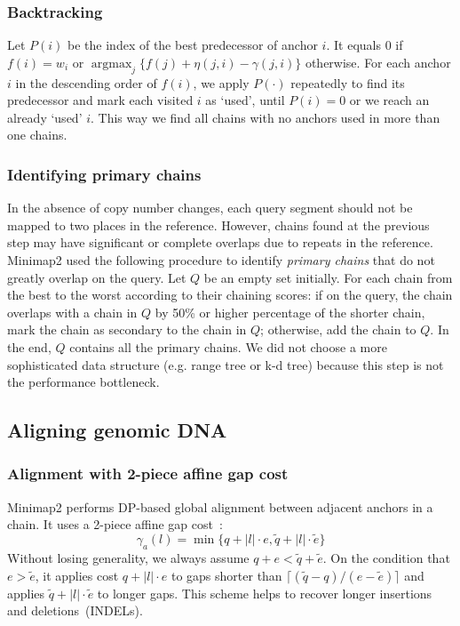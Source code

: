 \documentclass{bioinfo}
\DeclareMathOperator*{\argmax}{argmax}
\begin{document}
\begin{methods}
\subsubsection{Backtracking}
Let $P(i)$ be the index of the best predecessor of anchor $i$. It equals 0 if
$f(i)=w_i$ or $\argmax_j\{f(j)+\eta(j,i)-\gamma(j,i)\}$ otherwise. For each
anchor $i$ in the descending order of $f(i)$, we apply $P(\cdot)$ repeatedly to
find its predecessor and mark each visited $i$ as `used', until $P(i)=0$ or we
reach an already `used' $i$. This way we find all chains with no anchors used
in more than one chains.

\subsubsection{Identifying primary chains}
In the absence of copy number changes, each query segment should not be mapped
to two places in the reference. However, chains found at the previous step may
have significant or complete overlaps due to repeats in the reference.
Minimap2 used the following procedure to identify \emph{primary chains} that do
not greatly overlap on the query. Let $Q$ be an empty set initially. For each
chain from the best to the worst according to their chaining scores: if on the
query, the chain overlaps with a chain in $Q$ by 50\% or higher percentage of
the shorter chain, mark the chain as secondary to the chain in $Q$; otherwise,
add the chain to $Q$. In the end, $Q$ contains all the primary chains. We did
not choose a more sophisticated data structure (e.g. range tree or k-d tree)
because this step is not the performance bottleneck.

\subsection{Aligning genomic DNA}

\subsubsection{Alignment with 2-piece affine gap cost}

Minimap2 performs DP-based global alignment between adjacent anchors in a
chain. It uses a 2-piece affine gap cost~\citep{Gotoh:1990aa}:
\begin{equation}\label{eq:2-piece}
\gamma_a(l)=\min\{q+|l|\cdot e,\tilde{q}+|l|\cdot\tilde{e}\}
\end{equation}
Without losing generality, we always assume $q+e<\tilde{q}+\tilde{e}$.
On the condition that $e>\tilde{e}$, it applies cost $q+|l|\cdot e$ to gaps
shorter than $\lceil(\tilde{q}-q)/(e-\tilde{e})\rceil$ and applies
$\tilde{q}+|l|\cdot\tilde{e}$ to longer gaps.  This scheme helps to recover
longer insertions and deletions~(INDELs).


\end{methods}
\end{document}
